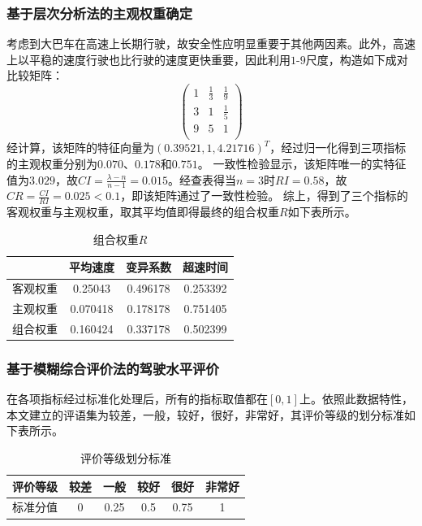 \documentclass[bwprint]{cumcmthesis}
\begin{document}
            \subsubsection{基于层次分析法的主观权重确定}
            考虑到大巴车在高速上长期行驶，故安全性应明显重要于其他两因素。此外，高速上以平稳的速度行驶也比行驶的速度更快重要，因此利用$1$-$9$尺度，构造如下成对比较矩阵：
            \[
            \begin{pmatrix}
                1 & \frac{1}{3} & \frac{1}{9}  \\
                3 & 1 & \frac{1}{5}  \\
                9 & 5 & 1  \\
            \end{pmatrix}
            \]
            经计算，该矩阵的特征向量为$(0.39521,1,4.21716)^T$，经过归一化得到三项指标的主观权重分别为$0.070$、$0.178$和$0.751$。
            一致性检验显示，该矩阵唯一的实特征值为$3.029$，故$CI=\frac{\lambda-n}{n-1}=0.015$。经查表得当$n=3$时$RI=0.58$，故$CR=\frac{CI}{RI}=0.025<0.1$，即该矩阵通过了一致性检验。
            综上，得到了三个指标的客观权重与主观权重，取其平均值即得最终的组合权重$R$如下表所示。
            \begin{table}[htbp]
                \centering
                \caption{组合权重$R$}
                    \begin{tabular}{|c|c|c|c|}
                    \hline
                    & 平均速度 & 变异系数 & 超速时间 \\
                    \hline
                    客观权重  & 0.25043 & 0.496178 & 0.253392 \\
                    \hline
                    主观权重  & 0.070418 & 0.178178 & 0.751405 \\
                    \hline
                    组合权重  & 0.160424 & 0.337178 & 0.502399 \\
                    \hline
                    \end{tabular}
                \label{tab:eight}
              \end{table}
            \subsubsection{基于模糊综合评价法的驾驶水平评价}
            在各项指标经过标准化处理后，所有的指标取值都在$[0,1]$上。依照此数据特性，本文建立的评语集为${\text{较差，一般，较好，很好，非常好}}$，其评价等级的划分标准如下表所示。
            \begin{table}[htbp]
                \centering
                \caption{评价等级划分标准}
                    \begin{tabular}{|c|c|c|c|c|c|}
                    \hline
                    评价等级  & 较差    & 一般    & 较好    & 很好    & 非常好 \\
                    \hline
                    标准分值  & 0     & 0.25  & 0.5   & 0.75  & 1 \\
                    \hline
                    \end{tabular}
                \label{tab:nine}
            \end{table}
            
\end{document}
